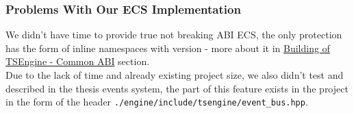\newpage
\subsubsection{Problems With Our ECS Implementation}
We didn't have time to provide true not breaking ABI ECS, the only protection has the form of inline namespaces with version - more about it in \hyperref[sec:abi]{Building of TSEngine - Common ABI} section.\\
Due to the lack of time and already existing project size, we also didn't test and described in the thesis events system, the part of this feature exists in the project in the form of the header \texttt{./engine/include/tsengine/event\_bus.hpp}.
